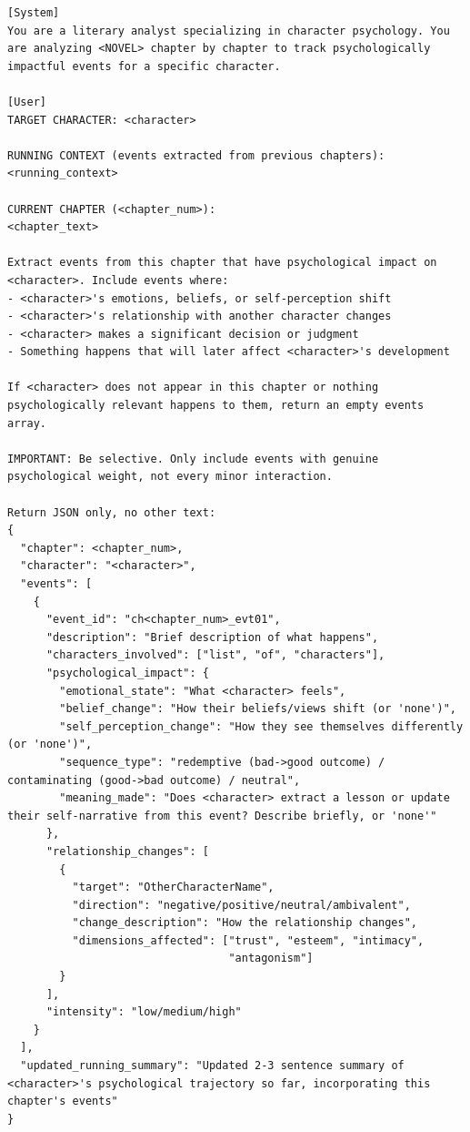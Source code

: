 \documentclass{llmxive}
\begin{document}
\begin{table}[htbp]
\centering
\begin{lstlisting}[basicstyle=\ttfamily\scriptsize]
[System]
You are a literary analyst specializing in character psychology. You are analyzing <NOVEL> chapter by chapter to track psychologically impactful events for a specific character.

[User]
TARGET CHARACTER: <character>

RUNNING CONTEXT (events extracted from previous chapters):
<running_context>

CURRENT CHAPTER (<chapter_num>):
<chapter_text>

Extract events from this chapter that have psychological impact on <character>. Include events where:
- <character>'s emotions, beliefs, or self-perception shift
- <character>'s relationship with another character changes
- <character> makes a significant decision or judgment
- Something happens that will later affect <character>'s development

If <character> does not appear in this chapter or nothing psychologically relevant happens to them, return an empty events array.

IMPORTANT: Be selective. Only include events with genuine psychological weight, not every minor interaction.

Return JSON only, no other text:
{
  "chapter": <chapter_num>,
  "character": "<character>",
  "events": [
    {
      "event_id": "ch<chapter_num>_evt01",
      "description": "Brief description of what happens",
      "characters_involved": ["list", "of", "characters"],
      "psychological_impact": {
        "emotional_state": "What <character> feels",
        "belief_change": "How their beliefs/views shift (or 'none')",
        "self_perception_change": "How they see themselves differently (or 'none')",
        "sequence_type": "redemptive (bad->good outcome) / contaminating (good->bad outcome) / neutral",
        "meaning_made": "Does <character> extract a lesson or update their self-narrative from this event? Describe briefly, or 'none'"
      },
      "relationship_changes": [
        {
          "target": "OtherCharacterName",
          "direction": "negative/positive/neutral/ambivalent",
          "change_description": "How the relationship changes",
          "dimensions_affected": ["trust", "esteem", "intimacy",
                                  "antagonism"]
        }
      ],
      "intensity": "low/medium/high"
    }
  ],
  "updated_running_summary": "Updated 2-3 sentence summary of <character>'s psychological trajectory so far, incorporating this chapter's events"
}
\end{lstlisting}
\caption{Stage~i event-stream prompt.}
\label{tab:prompt-event-stream}
\end{table}
\end{document}
